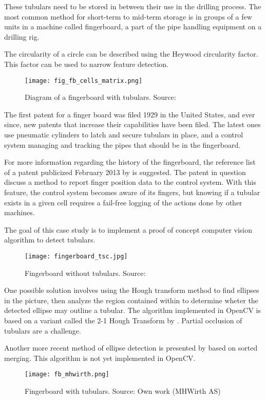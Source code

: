 These tubulars need to be stored in between their use in the drilling process. The most common method for short-term to mid-term storage is in groups of a few units in a machine called fingerboard, a part of the pipe handling equipment on a drilling rig.

The circularity of a circle can be described using the Heywood circularity factor. This factor can be used to narrow feature detection.

\begin{figure}[ht]
    \centering
    \texttt{[image: fig\_fb\_cells\_matrix.png]}
    \caption{Diagram of a fingerboard with tubulars. Source:\cite{fig_fb_cells_matrix13}}
    \label{fig:fb_cells_matrix}
\end{figure}
\FloatBarrier

The first patent for a finger board was filed 1929 in the United States, and ever since, new patents that increase their capabilities have been filed. The latest ones use pneumatic cylinders to latch and secure tubulars in place, and a control system managing and tracking the pipes that should be in the fingerboard.

For more information regarding the history of the fingerboard, the reference list of a patent publicized February 2013 by \citet{pat_james13} is suggested. The patent in question discuss a method to report finger position data to the control system. With this feature, the control system becomes aware of its fingers, but knowing if a tubular exists in a given cell requires a fail-free logging of the actions done by other machines.

The goal of this case study is to implement a proof of concept computer vision algorithm to detect tubulars.

\begin{figure}[ht]
    \centering
    \texttt{[image: fingerboard\_tsc.jpg]}
    \caption{Fingerboard without tubulars. Source:\cite{fig_fb_tsc15}}
    \label{fig:fb_tsc15}
\end{figure}
\FloatBarrier

One possible solution involves using the Hough transform method to find ellipses in the picture, then analyze the region contained within to determine wheter the detected ellipse may outline a tubular. The algorithm implemented in OpenCV is based on a variant called the 2-1 Hough Transform by \citet{yuen90}. Partial occlusion of tubulars are a challenge.

Another more recent method of ellipse detection is presented by \citet{wang14} based on sorted merging. This algorithm is not yet implemented in OpenCV.

\begin{figure}[ht]
    \centering
    \texttt{[image: fb\_mhwirth.png]}
    \caption{Fingerboard with tubulars. Source: Own work (MHWirth AS)}
    \label{fig:fb_mhwirth}
\end{figure}
\FloatBarrier

